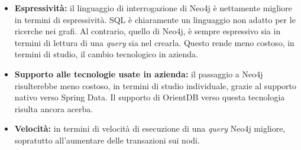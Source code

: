 \begin{itemize}
\item{\textbf{Espressività:}} il linguaggio di interrogazione di Neo4j è nettamente migliore in termini di espressività. SQL è chiaramente un linguaggio non adatto per le ricerche nei grafi. Al contrario, quello di Neo4j, è sempre espressivo sia in termini di lettura di una \textit{query} sia nel crearla. Questo rende meno costoso, in termini di studio, il cambio tecnologico in azienda. 
\item{\textbf{Supporto alle tecnologie usate in azienda:}} il passaggio a Neo4j risulterebbe meno costoso, in termini di studio individuale, grazie al supporto nativo verso Spring Data. Il supporto di OrientDB verso questa tecnologia risulta ancora acerba.

\item{\textbf{Velocità:}} in termini di velocità di esecuzione di una \textit{query} Neo4j migliore, sopratutto all'aumentare delle transazioni sui nodi.
\end{itemize}















